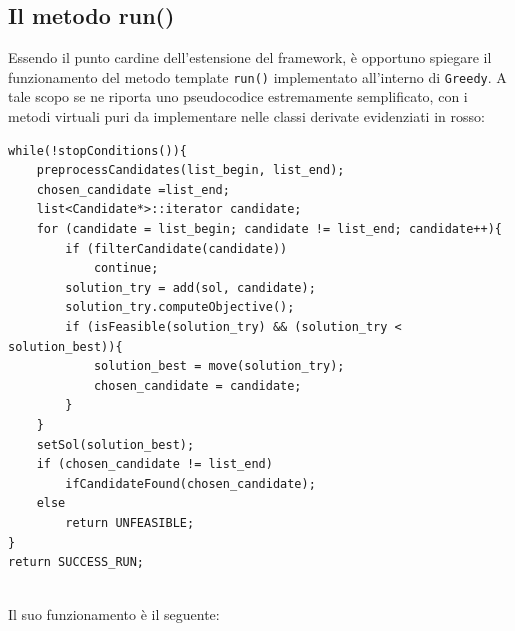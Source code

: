\subsection{Il metodo run()}
Essendo il punto cardine dell'estensione del framework, è opportuno spiegare il funzionamento del metodo template \texttt{run()} implementato all'interno di \texttt{Greedy}. A tale scopo se ne riporta uno pseudocodice estremamente semplificato, con i metodi virtuali puri da implementare nelle classi derivate evidenziati in rosso:
\newpage
\begin{lstlisting}
while(!stopConditions()){
    preprocessCandidates(list_begin, list_end);
    chosen_candidate =list_end;
    list<Candidate*>::iterator candidate;
    for (candidate = list_begin; candidate != list_end; candidate++){
        if (filterCandidate(candidate))
            continue;
        solution_try = add(sol, candidate);
        solution_try.computeObjective();
        if (isFeasible(solution_try) && (solution_try < solution_best)){
            solution_best = move(solution_try);
            chosen_candidate = candidate;
        }  
    }
    setSol(solution_best);
    if (chosen_candidate != list_end)
        ifCandidateFound(chosen_candidate);
    else
        return UNFEASIBLE;
}
return SUCCESS_RUN;
\end{lstlisting}
\noindent
\\
Il suo funzionamento è il seguente:
